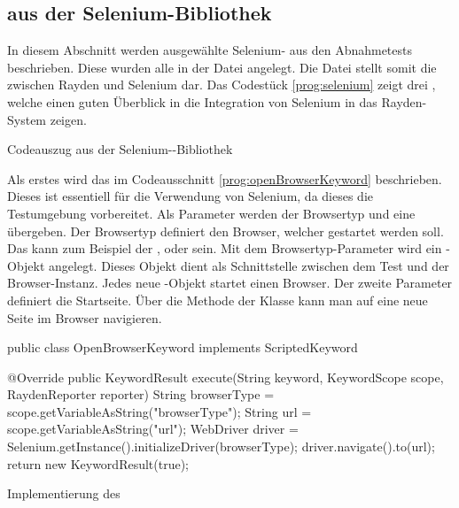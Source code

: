 
\subsection{ aus der Selenium-Bibliothek}
\label{cha:TestenSelenium}

In diesem Abschnitt werden ausgewählte Selenium- aus den Abnahmetests beschrieben. Diese  wurden alle in der Datei  angelegt. Die Datei  stellt somit die  zwischen Rayden und Selenium dar. Das Codestück \ref{prog:selenium} zeigt drei , welche einen guten Überblick in die Integration von Selenium in das Rayden-System zeigen. 

\begin{program}

\caption{Codeauszug aus der Selenium--Bibliothek}
\label{prog:selenium}
\end{program}

\SuperPar
Als erstes wird das  im Codeausschnitt \ref{prog:openBrowserKeyword} beschrieben. Dieses  ist essentiell für die Verwendung von Selenium, da dieses  die Testumgebung vorbereitet. Als Parameter werden der Browsertyp und eine  übergeben. Der Browsertyp definiert den Browser, welcher gestartet werden soll. Das kann zum Beispiel der ,  oder  sein. Mit dem Browsertyp-Parameter wird ein -Objekt angelegt. Dieses Objekt dient als Schnittstelle zwischen dem Test und der Browser-Instanz. Jedes neue -Objekt startet einen Browser. Der zweite Parameter  definiert die Startseite. Über die Methode  der Klasse  kann man auf eine neue Seite im Browser navigieren. 

\begin{program}
\begin{JavaCode}
public class OpenBrowserKeyword implements ScriptedKeyword {

	@Override
	public KeywordResult execute(String keyword, KeywordScope scope, RaydenReporter reporter) {
		String browserType = scope.getVariableAsString("browserType");
		String url = scope.getVariableAsString("url");
		WebDriver driver = Selenium.getInstance().initializeDriver(browserType);
		driver.navigate().to(url);
		return new KeywordResult(true);
	}
}
\end{JavaCode}
\caption{Implementierung des }
\label{prog:openBrowserKeyword}
\end{program}

